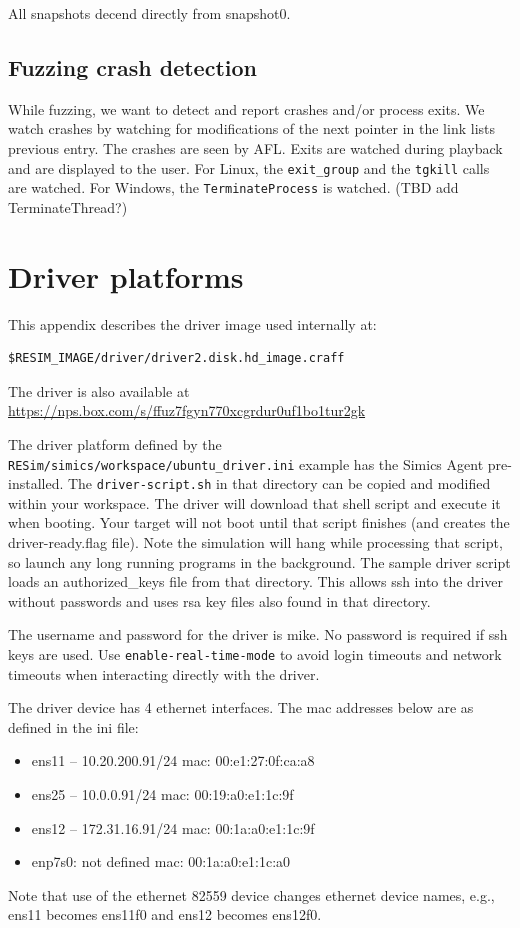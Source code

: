 \documentclass[titlepage]{article}
\begin{document}
\begin{appendices}
All snapshots decend directly from snapshot0.

\subsection{Fuzzing crash detection}
While fuzzing, we want to detect and report crashes and/or process exits.
We watch crashes by watching for modifications of the next pointer in the link lists previous entry.
The crashes are seen by AFL.
Exits are watched during playback and are displayed to the user.  For Linux, the {\tt exit\_group} and the
{\tt tgkill} calls are watched.  For Windows, the {\tt TerminateProcess} is watched.  (TBD add TerminateThread?)


\section{Driver platforms}
\label{driver}
This appendix describes the driver image used internally at:
\begin{verbatim}
$RESIM_IMAGE/driver/driver2.disk.hd_image.craff
\end{verbatim}
The driver is also available at \url{https://nps.box.com/s/ffuz7fgyn770xcgrdur0uf1bo1tur2gk}

The driver platform defined by the {\tt RESim/simics/workspace/ubuntu\_driver.ini} example has the Simics Agent pre-installed.  The
{\tt driver-script.sh} in that directory can be copied and modified within your workspace.  The driver will download that shell script and execute
it when booting.  Your target will not boot until that script finishes (and creates the driver-ready.flag file).
Note the simulation will hang while processing that script, so launch any long running programs in the background.
The sample driver script loads an authorized\_keys file from that directory.  This allows ssh into the driver without passwords and uses
rsa key files also found in that directory.

The username and password for the driver is mike. No password is required if ssh keys are used.  Use {\tt enable-real-time-mode} to avoid login timeouts and network timeouts when
interacting directly with the driver.  

The driver device has 4 ethernet interfaces.  The mac addresses below are as defined in the ini file:
\begin{itemize}
\item ens11 -- 10.20.200.91/24  mac: 00:e1:27:0f:ca:a8
\item ens25 -- 10.0.0.91/24     mac: 00:19:a0:e1:1c:9f
\item ens12 -- 172.31.16.91/24  mac: 00:1a:a0:e1:1c:9f
\item enp7s0:  not defined      mac: 00:1a:a0:e1:1c:a0 
\end{itemize}
Note that use of the ethernet 82559 device changes ethernet device names, e.g., ens11 becomes ens11f0 and ens12 becomes ens12f0.


\end{appendices}
\end{document}
